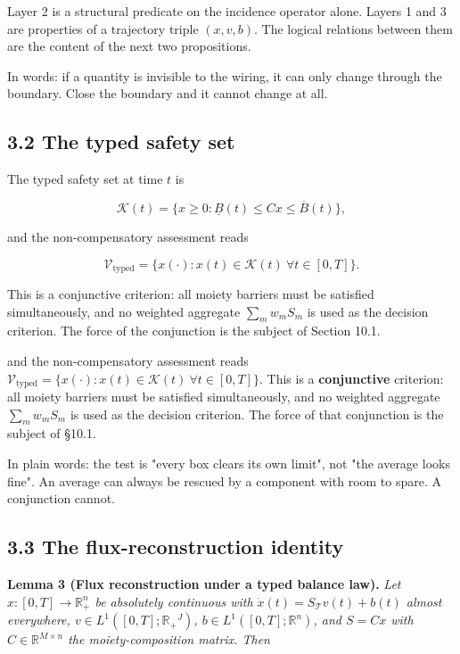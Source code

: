 \documentclass[11pt]{article}
\begin{document}
Layer 2 is a structural predicate on the incidence operator alone. Layers 1 and 3 are properties of a trajectory triple \((x,v,b)\). The logical relations between them are the content of the next two propositions.

In words: if a quantity is invisible to the wiring, it can only change through the boundary. Close the boundary and it cannot change at all.

\subsection*{3.2 The typed safety set}\label{32-the-typed-safety-set}

The typed safety set at time \(t\) is 

$$\mathcal{K}(t) = \{ x \ge 0 : \underline{B}(t) \le Cx \le \overline{B}(t) \},$$

 and the non-compensatory assessment reads 

$$\mathcal{V}_{\mathrm{typed}} = \{ x(\cdot) : x(t) \in \mathcal{K}(t)\ \forall t \in [0,T] \}.$$

 This is a conjunctive criterion: all moiety barriers must be satisfied simultaneously, and no weighted aggregate \(\sum_m w_m S_m\) is used as the decision criterion. The force of the conjunction is the subject of Section 10.1.

and the non-compensatory assessment reads \(\mathcal V_{\mathrm{typed}}=\allowbreak{}\{x(\cdot): x(t)\in\mathcal K(t)\ \forall t\in[0,\allowbreak{}T]\}\). This is a \textbf{conjunctive} criterion: all moiety barriers must be satisfied simultaneously, and no weighted aggregate \(\sum_m w_m S_m\) is used as the decision criterion. The force of that conjunction is the subject of \S10.1.

In plain words: the test is "every box clears its own limit", not "the average looks fine". An average can always be rescued by a component with room to spare. A conjunction cannot.

\subsection*{3.3 The flux-reconstruction identity}\label{33-the-flux-reconstruction-identity}

\textbf{Lemma 3 (Flux reconstruction under a typed balance law).} \emph{Let \(x : [0,T] \to \mathbb{R}_+^n\) be absolutely continuous with \(\dot x(t) =\allowbreak{} S_{\mathcal{T}} v(t) +\allowbreak{} b(t)\) almost everywhere, \(v \in L^1([0,\allowbreak{}T]; \mathbb{R}_+\allowbreak{}^J)\), \(b \in L^1([0,\allowbreak{}T]; \mathbb{R}^n)\), and \(S = Cx\) with \(C \in \mathbb{R}^{M \times n}\) the moiety-composition matrix. Then} 
\end{document}
